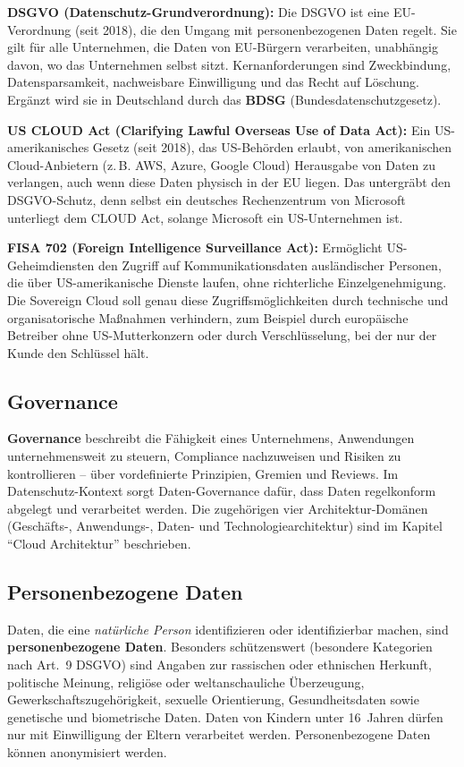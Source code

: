 \textbf{DSGVO (Datenschutz-Grundverordnung):}
Die DSGVO ist eine EU-Verordnung (seit 2018), die den Umgang mit
personenbezogenen Daten regelt. Sie gilt für alle Unternehmen, die
Daten von EU-Bürgern verarbeiten, unabhängig davon, wo das Unternehmen
selbst sitzt. Kernanforderungen sind Zweckbindung, Datensparsamkeit,
nachweisbare Einwilligung und das Recht auf Löschung. Ergänzt wird
sie in Deutschland durch das \textbf{BDSG} (Bundesdatenschutzgesetz).

\textbf{US CLOUD Act (Clarifying Lawful Overseas Use of Data Act):}
Ein US-amerikanisches Gesetz (seit 2018), das US-Behörden erlaubt,
von amerikanischen Cloud-Anbietern (z.\,B. AWS, Azure, Google Cloud)
Herausgabe von Daten zu verlangen, auch wenn diese Daten physisch
in der EU liegen. Das untergräbt den DSGVO-Schutz, denn selbst ein
deutsches Rechenzentrum von Microsoft unterliegt dem CLOUD Act,
solange Microsoft ein US-Unternehmen ist.

\textbf{FISA 702 (Foreign Intelligence Surveillance Act):}
Ermöglicht US-Geheimdiensten den Zugriff auf Kommunikationsdaten
ausländischer Personen, die über US-amerikanische Dienste laufen,
ohne richterliche Einzelgenehmigung.\\[4pt]
Die Sovereign Cloud soll genau diese Zugriffsmöglichkeiten
durch technische und organisatorische Maßnahmen verhindern,
zum Beispiel durch europäische Betreiber ohne US-Mutterkonzern
oder durch Verschlüsselung, bei der nur der Kunde den Schlüssel hält.

\subsection{Governance}
\textbf{Governance} beschreibt die Fähigkeit eines Unternehmens, Anwendungen
unternehmensweit zu steuern, Compliance nachzuweisen und Risiken zu
kontrollieren -- über vordefinierte Prinzipien, Gremien und Reviews. Im
Datenschutz-Kontext sorgt Daten-Governance dafür, dass Daten regelkonform
abgelegt und verarbeitet werden. Die zugehörigen vier Architektur-Domänen
(Geschäfts-, Anwendungs-, Daten- und Technologiearchitektur) sind im Kapitel
\enquote{Cloud Architektur} beschrieben.

\subsection{Personenbezogene Daten}
Daten, die eine \emph{natürliche Person} identifizieren oder identifizierbar machen, sind \textbf{personenbezogene Daten}. Besonders schützenswert (besondere Kategorien nach Art.~9 DSGVO) sind Angaben zur rassischen oder ethnischen Herkunft, politische Meinung, religiöse oder weltanschauliche Überzeugung, Gewerkschaftszugehörigkeit, sexuelle Orientierung, Gesundheitsdaten sowie genetische und biometrische Daten. Daten von Kindern unter 16~Jahren dürfen nur mit Einwilligung der Eltern verarbeitet werden. Personenbezogene Daten können anonymisiert werden.
